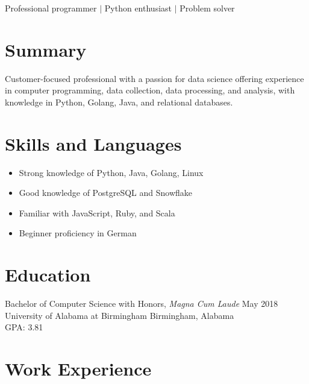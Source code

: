 \documentclass[10pt]{setzerresume}
\begin{document}

  \centerline { Professional programmer $|$ Python enthusiast $|$ Problem solver }

  \section{Summary}
  Customer-focused professional with a passion for data science offering experience in computer programming, data collection, data processing, and analysis, with knowledge in Python, Golang, Java, and relational databases.

  \section{Skills and Languages}

  \begin{itemize}[nosep]
    \item Strong knowledge of Python, Java, Golang, Linux
    \item Good knowledge of PostgreSQL and Snowflake
    \item Familiar with JavaScript, Ruby, and Scala
    \item Beginner proficiency in German
  \end{itemize}

  \section{Education}
  Bachelor of Computer Science with Honors, \textit{Magna Cum Laude} \hfill May 2018 \\
  University of Alabama at Birmingham \hfill Birmingham, Alabama \\
  GPA\@: 3.81


  \section{Work Experience}

\end{document}
